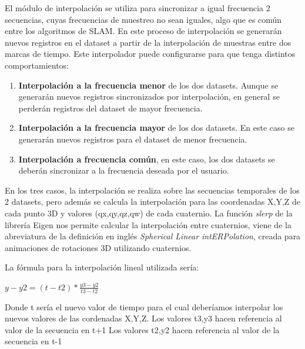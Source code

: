 	El módulo de interpolación se utiliza para sincronizar a igual frecuencia 2 secuencias, cuyas frecuencias de muestreo no sean iguales, algo que es común entre los algoritmos de SLAM.
	En este proceso de interpolación se generarán nuevos registros en el dataset a partir de la interpolación de muestras entre dos marcas de tiempo.
	Este interpolador puede configurarse para que tenga distintos comportamientos:
    \begin{enumerate}
	 
	 \item{\textbf{Interpolación a la frecuencia menor}} de los dos datasets. Aunque se generarán nuevos registros sincronizados por interpolación, en general se perderán registros del dataset de mayor frecuencia.

	 \item{\textbf{Interpolación a la frecuencia mayor}} de los dos datasets. En este caso se generarán nuevos registros para el dataset de menor frecuencia.

	 \item{\textbf{Interpolación a frecuencia común}}, en este caso, los dos datasets se deberán sincronizar a la frecuencia deseada por el usuario.
	 \end{enumerate}

	 En los tres casos, la interpolación se realiza sobre las secuencias temporales de los 2 datasets, pero además se calcula la interpolación para las coordenadas X,Y,Z de cada punto 3D y valores (qx,qy,qz,qw) de cada cuaternio. La función \textit{slerp} de la librería Eigen nos permite calcular la interpolación entre cuaternios, viene de la abreviatura de la definición en inglés \textit{Spherical Linear intERPolation}, creada para animaciones de rotaciones 3D utilizando cuaternios.


	 La fórmula para la interpolación lineal utilizada sería:

	 \begin{center}
	 \begin{math}
		y-y2= (t-t2)*\frac{y3-y2}{t3-t2}
	 \end{math}
	 \end{center}

	 Donde t sería el nuevo valor de tiempo para el cual deberíamos interpolar los nuevos valores de las cordenadas X,Y,Z. 
	 Los valores t3,y3 hacen referencia al valor de la secuencia en t+1
	 Los valores t2,y2 hacen referencia al valor de la secuencia en t-1

	 



